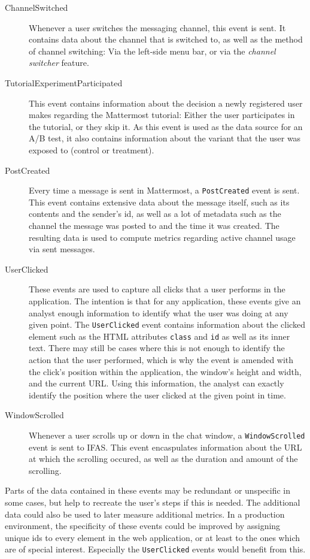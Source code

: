 \begin{description}
\item[ChannelSwitched]
Whenever a user switches the messaging channel, this event is sent.
It contains data about the channel that is switched to, as well as the method of channel switching: Via the left-side menu bar, or via the \emph{channel switcher} feature.
\item[TutorialExperimentParticipated]
This event contains information about the decision a newly registered user makes regarding the Mattermost tutorial:
Either the user participates in the tutorial, or they skip it.
As this event is used as the data source for an A/B test, it also contains information about the variant that the user was exposed to (control or treatment).
\item[PostCreated]
Every time a message is sent in Mattermost, a \texttt{PostCreated} event is sent.
This event contains extensive data about the message itself, such as its contents and the sender's id, as well as a lot of metadata such as the channel the message was posted to and the time it was created.
The resulting data is used to compute metrics regarding active channel usage via sent messages.
\item[UserClicked]
These events are used to capture all clicks that a user performs in the application.
The intention is that for any application, these events give an analyst enough information to identify what the user was doing at any given point.
The \texttt{UserClicked} event contains information about the clicked element such as the HTML attributes \texttt{class} and \texttt{id} as well as its inner text.
There may still be cases where this is not enough to identify the action that the user performed, which is why the event is amended with the click's position within the application, the window's height and width, and the current URL.
Using this information, the analyst can exactly identify the position where the user clicked at the given point in time.
\item[WindowScrolled]
Whenever a user scrolls up or down in the chat window, a \texttt{WindowScrolled} event is sent to \ac{IFAS}.
This event encaspulates information about the URL at which the scrolling occured, as well as the duration and amount of the scrolling.
\end{description}

Parts of the data contained in these events may be redundant or unspecific in some cases, but help to recreate the user's steps if this is needed.
The additional data could also be used to later measure additional metrics.
In a production environment, the specificity of these events could be improved by assigning unique ids to every element in the web application, or at least to the ones which are of special interest.
Especially the \texttt{UserClicked} events would benefit from this.

